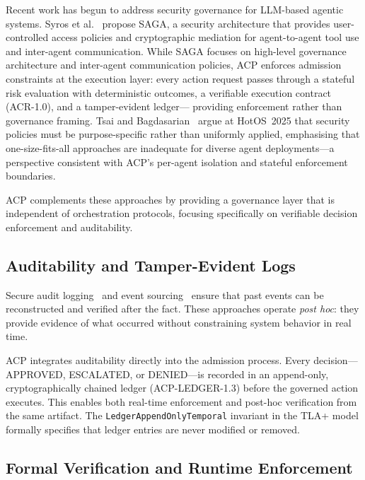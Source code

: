 \documentclass[11pt]{article}
\theoremstyle{definition}
\begin{document}
Recent work has begun to address security governance for LLM-based agentic systems.
Syros et al.~\cite{syros2025saga} propose SAGA, a security architecture that provides
user-controlled access policies and cryptographic mediation for agent-to-agent tool use
and inter-agent communication.
While SAGA focuses on high-level governance architecture and inter-agent
communication policies, ACP enforces admission constraints at the execution layer:
every action request passes through a stateful risk evaluation with deterministic
outcomes, a verifiable execution contract (ACR-1.0), and a tamper-evident ledger---
providing enforcement rather than governance framing.
Tsai and Bagdasarian~\cite{tsai2025contextual} argue at HotOS~2025 that security policies
must be purpose-specific rather than uniformly applied, emphasising that one-size-fits-all
approaches are inadequate for diverse agent deployments---a perspective consistent with
ACP's per-agent isolation and stateful enforcement boundaries.

ACP complements these approaches by providing a governance layer that is independent of
orchestration protocols, focusing specifically on verifiable decision enforcement and auditability.

\subsection{Auditability and Tamper-Evident Logs}

Secure audit logging~\cite{schneier1999secure} and event sourcing~\cite{fowler2005event} ensure
that past events can be reconstructed and verified after the fact.
These approaches operate \emph{post hoc}: they provide evidence of what occurred without
constraining system behavior in real time.

ACP integrates auditability directly into the admission process.
Every decision---APPROVED, ESCALATED, or DENIED---is recorded in an append-only, cryptographically
chained ledger (ACP-LEDGER-1.3) before the governed action executes.
This enables both real-time enforcement and post-hoc verification from the same artifact.
The \texttt{LedgerAppendOnlyTemporal} invariant in the TLA+ model formally specifies
that ledger entries are never modified or removed.

\subsection{Formal Verification and Runtime Enforcement}
\end{document}
